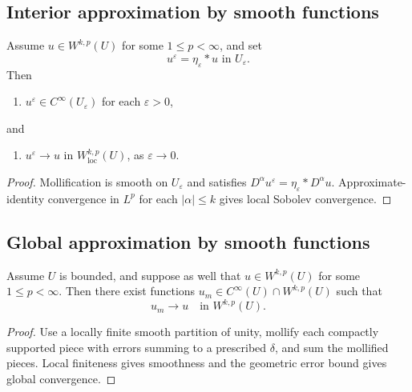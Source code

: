 \subsection{Interior approximation by smooth functions}

\begin{theorem}
\label{thm:local-smooth-approximation}

Assume $u \in W^{k,p}(U)$ for some $1 \le p < \infty$, and set
$$u^\varepsilon = \eta_\varepsilon * u \text{ in } U_\varepsilon.$$
Then
\begin{enumerate}
\item[(i)] $u^\varepsilon \in C^\infty(U_\varepsilon)$ for each $\varepsilon > 0$,
\end{enumerate}
and
\begin{enumerate}
\item[(ii)] $u^\varepsilon \to u$ in $W^{k,p}_{\text{loc}}(U)$, as $\varepsilon \to 0$.
\end{enumerate}
\end{theorem}

\begin{proof}
\sketch Mollification is smooth on $U_\varepsilon$ and satisfies $D^\alpha u^\varepsilon=\eta_\varepsilon*D^\alpha u$. Approximate-identity convergence in $L^p$ for each $|\alpha|\le k$ gives local Sobolev convergence.
\end{proof}

\subsection{Global approximation by smooth functions}

\begin{theorem}
\label{thm:global-smooth-approximation-interior}

Assume $U$ is bounded, and suppose as well that $u \in W^{k,p}(U)$ for some $1 \le p < \infty$. Then there exist functions $u_m \in C^\infty(U) \cap W^{k,p}(U)$ such that
$$u_m \to u \quad \text{in } W^{k,p}(U).$$
\end{theorem}

\begin{proof}
\sketch Use a locally finite smooth partition of unity, mollify each compactly supported piece with errors summing to a prescribed $\delta$, and sum the mollified pieces. Local finiteness gives smoothness and the geometric error bound gives global convergence.
\end{proof}

